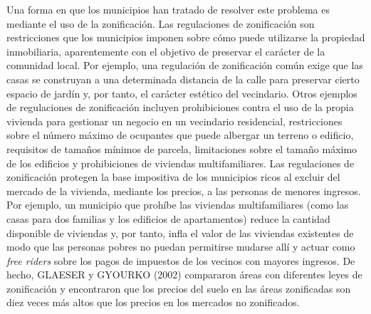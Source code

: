 \documentclass[10pt,a4paper]{article}
\begin{document}
Una forma en que los municipios han tratado de resolver este problema es mediante el uso de la zonificación. Las regulaciones de zonificación son restricciones que los municipios imponen sobre cómo puede utilizarse la propiedad inmobiliaria, aparentemente con el objetivo de preservar el carácter de la comunidad local. Por ejemplo, una regulación de zonificación común exige que las casas se construyan a una determinada distancia de la calle para preservar cierto espacio de jardín y, por tanto, el carácter estético del vecindario. Otros ejemplos de regulaciones de zonificación incluyen prohibiciones contra el uso de la propia vivienda para gestionar un negocio en un vecindario residencial, restricciones sobre el número máximo de ocupantes que puede albergar un terreno o edificio, requisitos de tamaños mínimos de parcela, limitaciones sobre el tamaño máximo de los edificios y prohibiciones de viviendas multifamiliares. Las regulaciones de zonificación protegen la base impositiva de los municipios ricos al excluir del mercado de la vivienda, mediante los precios, a las personas de menores ingresos. Por ejemplo, un municipio que prohíbe las viviendas multifamiliares (como las casas para dos familias y los edificios de apartamentos) reduce la cantidad disponible de viviendas y, por tanto, infla el valor de las viviendas existentes de modo que las personas pobres no puedan permitirse mudarse allí y actuar como \textit{free riders} sobre los pagos de impuestos de los vecinos con mayores ingresos. De hecho, GLAESER y GYOURKO (2002) compararon áreas con diferentes leyes de zonificación y encontraron que los precios del suelo en las áreas zonificadas son diez veces más altos que los precios en los mercados no zonificados.
\end{document}
